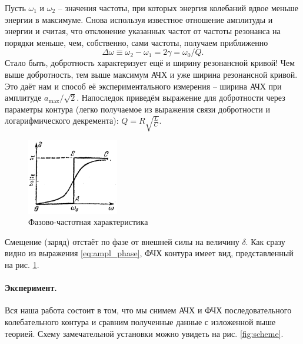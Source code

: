 \documentclass{../lab_class}
\begin{document}
Пусть $\omega_1$ и $\omega_2$ -- значения частоты, при которых энергия колебаний вдвое меньше энергии в максимуме. Снова используя известное отношение амплитуды и энергии и считая, что отклонение указанных частот от частоты резонанса на порядки меньше, чем, собственно, сами частоты, получаем приближенно
\begin{equation*}
	\Delta \omega \equiv \omega_2 - \omega_1 = 2 \gamma = \omega_0 / Q.
\end{equation*}
Стало быть, добротность характеризует ещё и ширину резонансной кривой! Чем выше добротность, тем выше максимум АЧХ и уже ширина резонансной кривой. Это даёт нам и способ её экспериментального измерения -- ширина АЧХ при амплитуде $a_{\max}/\sqrt{2}$. Напоследок приведём выражение для добротности через параметры контура (легко получаемое из выражения связи добротности и логарифмического декремента): $Q = R \sqrt{\frac{L}{C}}$.

\begin{figure}
	\centering
	\includegraphics[width=4cm]{freq_curve.png}
	\caption{Фазово-частотная характеристика}
	\label{fig:phase_resp}
\end{figure}

Смещение (заряд) отстаёт по фазе от внешней силы на величину $\delta$. Как сразу видно из выражения \ref{eq:ampl_phase}, ФЧХ контура имеет вид, представленный на рис. \ref{fig:phase_resp}.

\paragraph{Эксперимент.} Вся наша работа состоит в том, что мы снимем АЧХ и ФЧХ последовательного колебательного контура и сравним полученные данные с изложенной выше теорией. Схему замечательной установки можно увидеть на рис. \ref{fig:scheme}.
\end{document}
